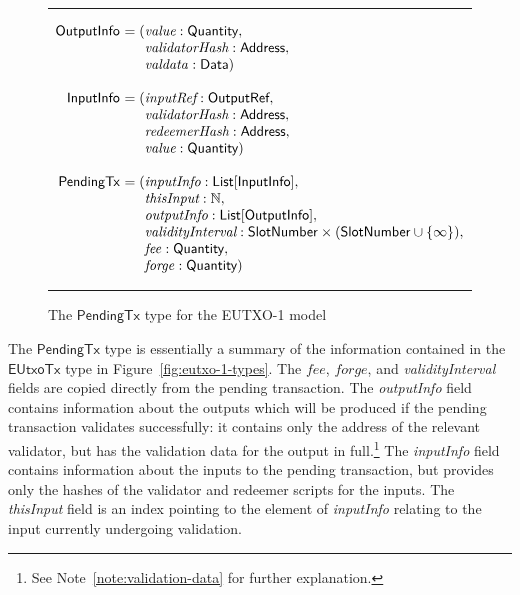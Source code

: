 \documentclass[a4paper]{article}
\newcounter{note}
\renewcommand{\i}{\textit}  %
\newcommand{\s}{\textsf}  %
\newenvironment{arraydefs}[1]{\setlength{\arraycolsep}{0pt}\begin{array}{#1}}{\end{array}}
\newcommand\rfskip{7pt}
\newenvironment{ruledfigure}[1]{\begin{figure}[#1]\hrule\vspace{\rfskip}}{\vspace{\rfskip}\hrule\end{figure}}
\newcommand{\List}[1]{\ensuremath{\s{List}[#1]}}
\newcommand{\ptx}{\ensuremath{\s{PendingTx}}}
\newcommand{\mi}[1]{\ensuremath{\mathit{#1}}}
\newcommand{\forge}{\mi{forge}}
\newcommand{\fee}{\mi{fee}}
\newcommand{\valdata}{\mi{valdata}}
\newcommand{\Data}{\ensuremath{\mathsf{Data}}}
\newcommand{\msf}[1]{\ensuremath{\mathsf{#1}}}
\newcommand{\slotnum}{\msf{SlotNumber}}
\newcommand{\eutxotx}{\msf{EUtxoTx}}
\newcommand{\qty}{\ensuremath{\s{Quantity}}}
\newcommand\N{\ensuremath{\mathbb{N}}}
\begin{document}
\begin{ruledfigure}{H}
  \[
  \begin{arraydefs}{rll}
    
    \s{OutputInfo } &= (& \i{value}: \qty,\\
    && \i{validatorHash}: \s{Address},\\
    &&  \valdata: \Data)\\
    \\
    \s{InputInfo } & = (&\i{inputRef}: \s{OutputRef},\\
                 && \i{validatorHash}: \s{Address},\\
                 && \i{redeemerHash}: \s{Address},\\
                 && \i{value}: \qty)\\
     \\
     \ptx\s{ } &= (&\i{inputInfo}: \List{\s{InputInfo}},\\
     &&\i{thisInput}: \N,\\
     &&\i{outputInfo}: \List{\s{OutputInfo}},\\
     &&\i{validityInterval}: \slotnum \times (\slotnum \cup \{\infty\}),\\
     && \fee: \qty,\\
     &&\forge: \qty)
   \end{arraydefs}
 \]
  \caption{The $\ptx$ type for the EUTXO-1 model}
  \label{fig:ptx-1-types}
\end{ruledfigure}
\noindent The $\ptx$ type is essentially a summary of the information
contained in the $\eutxotx$ type in
Figure~\ref{fig:eutxo-1-types}. The \fee, \forge, and
\i{validityInterval} fields are copied directly from the pending
transaction.  The \i{outputInfo} field contains information about the
outputs which will be produced if the pending transaction validates
successfully: it contains only the address of the relevant validator,
but has the validation data for the output in full.\footnote{See
  Note~\ref{note:validation-data} for further explanation.}
The \i{inputInfo} field contains information about the
inputs to the pending transaction, but provides only the hashes of the
validator and redeemer scripts for the inputs.  The \i{thisInput}
field is an index pointing to the element of \i{inputInfo}
relating to the input currently undergoing validation.
\end{document}
